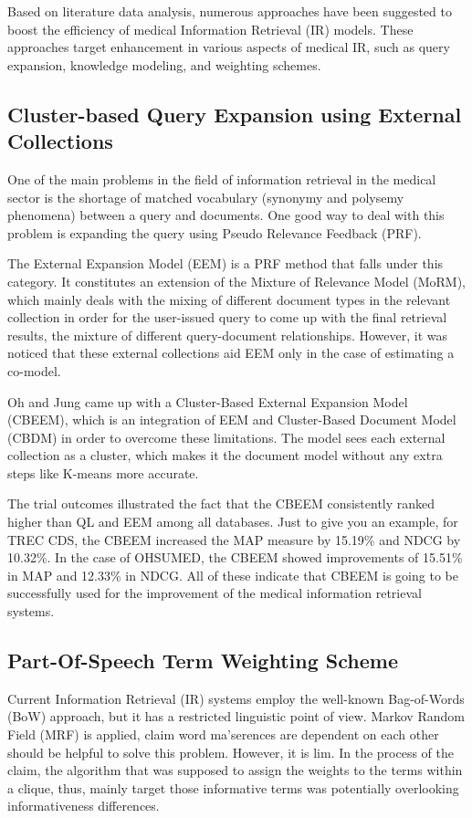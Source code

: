 \documentclass[conference]{IEEEtran}
\begin{document}
Based on literature data analysis, numerous approaches have been suggested to boost the efficiency of medical Information Retrieval (IR) models. These approaches target enhancement in  various aspects of medical IR, such as query expansion, knowledge modeling, and weighting schemes.

\subsection{Cluster-based Query Expansion using External Collections}

One of the main problems in the field of information retrieval in the medical sector is the shortage of matched vocabulary (synonymy and polysemy phenomena) between a query and documents. One good way to deal with this problem is expanding the query using Pseudo Relevance Feedback (PRF).

The External Expansion Model (EEM) is a PRF method that falls under this category. It constitutes an extension of the Mixture of Relevance Model (MoRM), which mainly deals with the mixing of different document types in the relevant collection in order for the user-issued query to come up with the final retrieval results, the mixture of different query-document relationships. However, it was noticed that these external collections aid EEM only in the case of estimating a co-model.

Oh and Jung \cite{Oh2015} came up with a Cluster-Based External Expansion Model (CBEEM), which is an integration of EEM and Cluster-Based Document Model (CBDM) in order to overcome these limitations. The model sees each external collection as a cluster, which makes it the document model without any extra steps like K-means more accurate.

The trial outcomes illustrated the fact that the CBEEM consistently ranked higher than QL and EEM among all databases. Just to give you an example, for TREC CDS, the CBEEM increased the MAP measure by 15.19\% and NDCG by 10.32\%. In the case of OHSUMED, the CBEEM showed improvements of 15.51\% in MAP and 12.33\% in NDCG. All of these indicate that CBEEM is going to be successfully used for the improvement of the medical information retrieval systems.

\subsection{Part-Of-Speech Term Weighting Scheme}

Current Information Retrieval (IR) systems employ the well-known Bag-of-Words (BoW) approach, but it has a restricted linguistic point of view. Markov Random Field (MRF) is applied, claim word ma'serences are dependent on each other should be helpful to solve this problem. However, it is lim. In the process of the claim, the algorithm that was supposed to assign the weights to the terms within a clique, thus, mainly target those informative terms was potentially overlooking informativeness differences.
\end{document}
